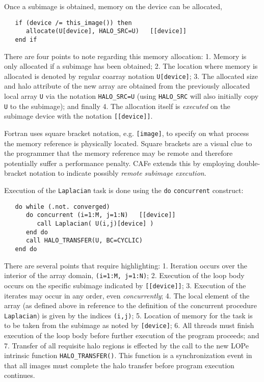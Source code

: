 Once a subimage is obtained, memory on the device can be allocated,
\begin{verbatim}
   if (device /= this_image()) then
      allocate(U[device], HALO_SRC=U)   [[device]]
   end if
\end{verbatim}
There are four points to note regarding this memory allocation: 1. Memory is only allocated if a
subimage has been obtained; 2. The location where memory is allocated is denoted by regular coarray
notation \texttt{U[device]}; 3. The allocated size and halo attribute of the new array are obtained
from the previously allocated local array \texttt{U} via the notation \texttt{HALO\_SRC=U} (using
\texttt{HALO\_SRC} will also initially copy \texttt{U} to the subimage); and finally 4. The
allocation itself is \emph{executed} on the subimage device with the notation \texttt{[[device]]}.

Fortran uses square bracket notation, e.g. \texttt{[image]}, to specify on what process the
memory reference is physically located.  Square brackets are a visual clue to the
programmer that the memory reference may be remote and therefore potentially suffer a
performance penalty.  CAFe extends this by employing double-bracket notation to indicate
possibly \emph{remote subimage execution}.

Execution of the \texttt{Laplacian} task is done using the \texttt{do}
\texttt{concurrent} construct:
\begin{verbatim}
   do while (.not. converged)
      do concurrent (i=1:M, j=1:N)   [[device]]
         call Laplacian( U(i,j)[device] )
      end do
      call HALO_TRANSFER(U, BC=CYCLIC)
   end do
\end{verbatim}
There are several points that require highlighting: 1. Iteration occurs over the interior
of the array domain, \texttt{(i=1:M, j=1:N)}; 2. Execution of the loop body occurs on the
specific subimage indicated by \texttt{[[device]]}; 3. Execution of the iterates may occur
in any order, even \emph{concurrently}; 4. The local element of the array (as
defined above in reference to the definition of the concurrent procedure
\texttt{Laplacian}) is given by the indices \texttt{(i,j)}; 5. Location of memory for the
task is to be taken from the subimage as noted by \texttt{[device]}; 6. All threads must finish
execution of the loop body before further execution of the program proceeds; and 7. Transfer of
all requisite halo regions is effected by the call to the new LOPe intrinsic function
\texttt{HALO\_TRANSFER()}.  This function is a synchronization event in that all images must
complete the halo transfer before program execution continues.

